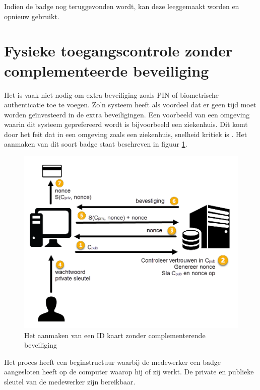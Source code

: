 Indien de badge nog teruggevonden wordt, kan deze leeggemaakt worden en opnieuw
gebruikt.

\section{Fysieke toegangscontrole zonder complementeerde beveiliging}

Het is vaak niet nodig om extra beveiliging zoals PIN of biometrische
authenticatie toe te voegen. Zo’n systeem heeft als voordeel dat er geen tijd
moet worden geïnvesteerd in de extra beveiligingen. Een voorbeeld van een
omgeving waarin dit systeem geprefereerd wordt is bijvoorbeeld een ziekenhuis.
Dit komt door het feit dat in een omgeving zoals een ziekenhuis, snelheid
kritiek is \autocite{Podevyn}. Het aanmaken van dit soort badge staat beschreven
in figuur \ref{fig:electronic-card-creation-no-pin}.

\begin{figure}[H]
	\includegraphics[width=\textwidth,keepaspectratio]{img/electronic-card-creation-no-pin.png}
	\centering
	\caption{Het aanmaken van een ID kaart zonder complementerende beveiliging}
	\label{fig:electronic-card-creation-no-pin}
\end{figure}

Het proces heeft een beginstructuur waarbij de medewerker een badge aangesloten
heeft op de computer waarop hij of zij werkt. De private en publieke sleutel van
de medewerker zijn bereikbaar.

